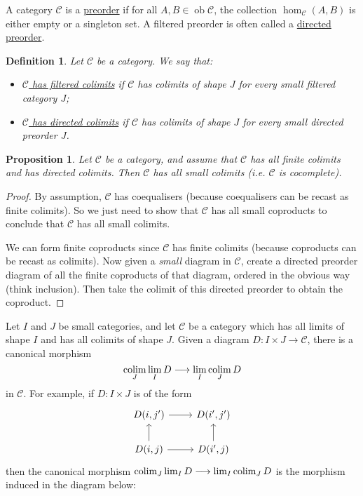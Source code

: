 \documentclass[a4paper,11pt]{article}
\theoremstyle{break_italics}
\newtheorem*{proposition*}{Proposition}
\newtheorem*{definition*}{Definition}
\theoremstyle{break_upright}
\theoremstyle{remark}
\newcommand{\ob}{\operatorname{ob}}
\newcommand{\C}{\mathcal{C}}
\def\colim{\qopname\relax m{colim}}
\begin{document}
A category $\C$ is a \uline{preorder} if for all $A,B\in\ob\C$, the collection $\hom_\C(A,B)$ is either empty or a singleton set. A filtered preorder is often called a \uline{directed preorder}.

\begin{definition*}
	Let $\C$ be a category. We say that:
	\begin{itemize}
		\item \uline{$\C$ has filtered colimits} if $\C$ has colimits of shape $J$ for every small filtered category $J$;
		\item \uline{$\C$ has directed colimits} if $\C$ has colimits of shape $J$ for every small directed preorder $J$.
	\end{itemize}
\end{definition*}


\begin{proposition*}
Let $\C$ be a category, and assume that $\C$ has all finite colimits and has directed colimits. Then $\C$ has all small colimits (i.e. $\C$ is cocomplete).
\end{proposition*}
\begin{proof}
	By assumption, $\C$ has coequalisers (because coequalisers can be recast as finite colimits). So we just need to show that $\C$ has all small coproducts to conclude that $\C$ has all small colimits.
	
	We can form finite coproducts since $\C$ has finite colimits (because coproducts can be recast as colimits). Now given a \textit{small} diagram in $\C$, create a directed preorder diagram of all the finite coproducts of that diagram, ordered in the obvious way (think inclusion). Then take the colimit of this directed preorder to obtain the coproduct.
\end{proof}

Let $I$ and $J$ be small categories, and let $\C$ be a category which has all limits of shape $I$ and has all colimits of shape $J$. Given a diagram $D \colon I \times J \to \C$, there is a canonical morphism
\[
 \colim_J \lim_I D \longrightarrow \lim_I \colim_J D
\]
in $\C$. For example, if $D \colon I \times J$ is of the form
\[
\begin{tikzcd}
{D(i,j')} \arrow[r]          & {D(i',j')}          \\
{D(i,j)} \arrow[u] \arrow[r] & {D(i',j)} \arrow[u]
\end{tikzcd}
\]
then the canonical morphism $\colim_J \lim_I D \longrightarrow \lim_I \colim_J D$ is the morphism induced in the diagram below:
\end{document}
